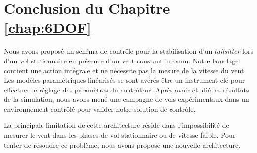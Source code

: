 \section{Conclusion du Chapitre \ref{chap:6DOF}}
Nous avons proposé un schéma de contrôle pour la stabilisation d'un \textit{tailsitter} lors d'un vol stationnaire en présence d'un vent constant inconnu. Notre bouclage contient une action intégrale et ne nécessite pas la mesure de la vitesse du vent. Les modèles paramétriques linéarisés se sont avérés être un instrument clé pour effectuer le réglage des paramètres du contrôleur.
Après avoir étudié les résultats de la simulation, nous avons mené une campagne de vols expérimentaux dans un environnement contrôlé pour valider notre solution de contrôle. 

La principale limitation de cette architecture réside dans l'impossibilité de mesurer le vent dans les phases de vol stationnaire ou de vitesse faible. Pour tenter de résoudre ce problème, nous avons proposé une nouvelle architecture.



